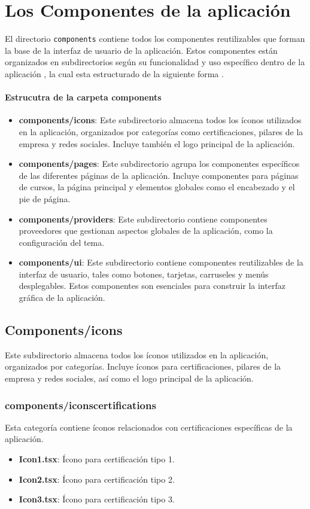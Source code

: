 \section{Los Componentes de la aplicación}
El directorio \texttt{components} contiene todos los componentes reutilizables que forman la base de la interfaz de usuario de la aplicación. Estos componentes están organizados en subdirectorios según su funcionalidad y uso específico dentro de la aplicación , la cual esta estructurado de la siguiente forma .

\paragraph{Estrucutra de la carpeta components}
\begin{itemize}
\item \textbf{components/icons}: Este subdirectorio almacena todos los íconos utilizados en la aplicación, organizados por categorías como certificaciones, pilares de la empresa y redes sociales. Incluye también el logo principal de la aplicación.
\item \textbf{components/pages}: Este subdirectorio agrupa los componentes específicos de las diferentes páginas de la aplicación. Incluye componentes para páginas de cursos, la página principal y elementos globales como el encabezado y el pie de página.
\item \textbf{components/providers}: Este subdirectorio contiene componentes proveedores que gestionan aspectos globales de la aplicación, como la configuración del tema.
\item \textbf{components/ui}: Este subdirectorio contiene componentes reutilizables de la interfaz de usuario, tales como botones, tarjetas, carruseles y menús desplegables. Estos componentes son esenciales para construir la interfaz gráfica de la aplicación.
\end{itemize}

\subsection{Components/icons}
Este subdirectorio almacena todos los íconos utilizados en la aplicación, organizados por categorías. Incluye íconos para certificaciones, pilares de la empresa y redes sociales, así como el logo principal de la aplicación.

\subsubsection{components/iconscertifications}
Esta categoría contiene íconos relacionados con certificaciones específicas de la aplicación.
\begin{itemize}
    \item \textbf{Icon1.tsx}: Ícono para certificación tipo 1.
    \item \textbf{Icon2.tsx}: Ícono para certificación tipo 2.
    \item \textbf{Icon3.tsx}: Ícono para certificación tipo 3.
\end{itemize}

